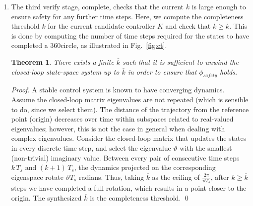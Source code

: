 \documentclass[twocolumn]{autart}    %
\newtheorem{theorem}{Theorem}
\newtheorem{proof}{Proof}
\begin{document}
\begin{enumerate}
\item The third {\sc verify} stage, {\sc complete}, checks that the current
$k$ is large enough to ensure safety for any further time steps.  
Here, we compute the completeness threshold $\overline{k}$ for the current candidate controller $K$ and
check that $k{\geq}\overline{k}$.  This is done by computing the number of time steps
required for the states to have completed a 360\textdegree circle, as illustrated in Fig.~\ref{fig:ct}. 

\begin{theorem} There exists a finite $\overline{k}$ such that it is
sufficient to unwind the closed-loop state-space system up to $\overline{k}$
in order to ensure that $\phi_\mathit{safety}$ holds. 
\end{theorem}

\begin{proof}
%
A stable control system is known to have converging dynamics.  Assume the
closed-loop matrix eigenvalues are not repeated (which is sensible to do,
since we select them).  The distance of the trajectory from the reference
point (origin) decreases over time within subspaces related to real-valued
eigenvalues; however, this is not the case in general when dealing with
complex eigenvalues.  Consider the closed-loop matrix that updates the
states in every discrete time step, and select the eigenvalue $\vartheta$
with the smallest (non-trivial) imaginary value.  Between every pair of
consecutive time steps $k\,T_s$ and $(k+1)\,T_s$, the dynamics projected on
the corresponding eigenspace rotate $\vartheta T_s$ radians.  Thus, taking
$\overline{k}$ as the ceiling of $\frac{2\pi}{\vartheta T_s}$, after
$k{\geq}\overline{k}$ steps we have completed a full rotation, which results
in a point closer to the origin.  The synthesized $\overline{k}$ is the completeness threshold.
\qed 
%
\end{proof}

\end{enumerate}
\end{document}
